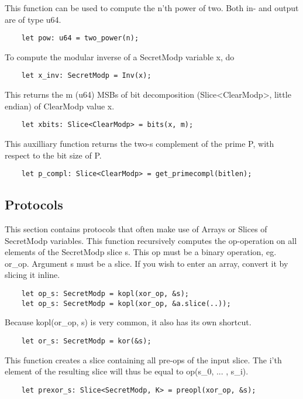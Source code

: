 This function can be used to compute the n'th power of two. Both in- and output are of type u64.
\begin{lstlisting}
	let pow: u64 = two_power(n);
\end{lstlisting}

To compute the modular inverse of a SecretModp variable x, do
\begin{lstlisting}
	let x_inv: SecretModp = Inv(x);
\end{lstlisting}

This returns the m (u64) MSBs of bit decomposition (Slice<ClearModp>, little endian) of ClearModp value x.
\begin{lstlisting}
	let xbits: Slice<ClearModp> = bits(x, m);
\end{lstlisting}

This auxilliary function returns the two-s complement of the prime P, with respect to the bit size of P.
\begin{lstlisting}
	let p_compl: Slice<ClearModp> = get_primecompl(bitlen);
\end{lstlisting}

\subsection{Protocols}
This section contains protocols that often make use of Arrays or Slices of SecretModp variables. 
This function recursively computes the op-operation on all elements of the SecretModp slice s. This op must be a binary operation, eg. or_op.
Argument s must be a slice. If you wish to enter an array, convert it by slicing it inline.
\begin{lstlisting}
	let op_s: SecretModp = kopl(xor_op, &s);
	let op_s: SecretModp = kopl(xor_op, &a.slice(..));
\end{lstlisting}

Because kopl(or_op, s) is very common, it also has its own shortcut.
\begin{lstlisting}
	let or_s: SecretModp = kor(&s);
\end{lstlisting}

This function creates a slice containing all pre-ops of the input slice. The i'th element of the resulting slice will thus be equal to op(s_0, ... , s_i).
\begin{lstlisting}
	let prexor_s: Slice<SecretModp, K> = preopl(xor_op, &s);
\end{lstlisting}

